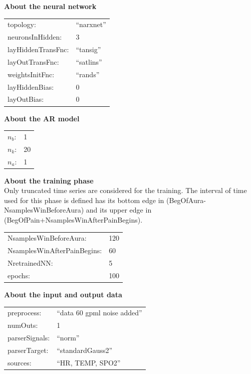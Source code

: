 \begin{description}
\item {\textbf{About the neural network}\hfill \\
\begin{tabular}{p{5cm}l}
 	topology: &``narxnet''\\
    neuronsInHidden: &3\\
    layHiddenTransFnc: &``tansig''\\
    layOutTransFnc: &``satlins''\\
    weightsInitFnc: &``rands''\\
    layHiddenBias: &0\\
    layOutBias: &0\\
\end{tabular}
}

\item {\textbf{About the AR model}\hfill \\
\begin{tabular}{p{5cm}l}
    $n_{b}$: &1 \\
    $n_{k}$: &20 \\
    $n_{a}$: &1 
\end{tabular}
}

\item {\textbf{About the training phase}\hfill \\
Only truncated time series are considered for the training. The interval of time used for this phase is defined has its bottom edge in (BegOfAura-NsamplesWinBeforeAura) and its upper edge in  (BegOfPain+NsamplesWinAfterPainBegins).\\
\begin{tabular}{p{5cm}l}
	NsamplesWinBeforeAura: &120 \\
    NsamplesWinAfterPainBegins: &60 \\
    NretrainedNN: &5 \\
    epochs: &100
\end{tabular}
}

\item {\textbf{About the input and output data}\hfill \\
\begin{tabular}{p{5cm}l}
	preprocess: &``data 60 gpml noise added''\\
   numOuts: &1\\
    parserSignals: &``norm''\\
  parserTarget: &``standardGauss2''\\
    sources: &``HR, TEMP, SPO2''
\end{tabular}

}
\end{description}
